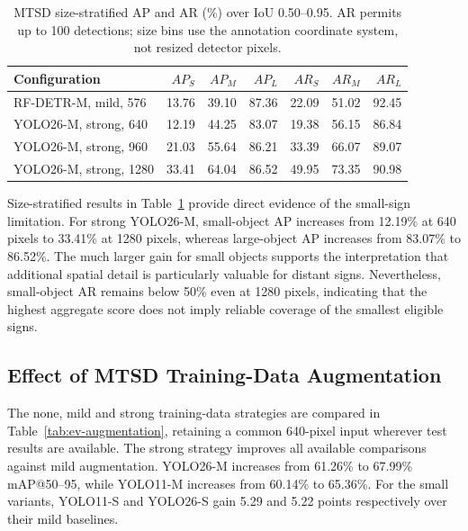 \begin{table}[htbp]
\centering
\small
\caption{\gls{MTSD} size-stratified \gls{AP} and AR (\%) over \gls{IoU} 0.50--0.95. AR permits up to 100 detections; size bins use the annotation coordinate system, not resized detector pixels.}
\label{tab:ev-size-ap}
\renewcommand{\arraystretch}{1.15}
\begin{tabularx}{\textwidth}{@{}>{\raggedright\arraybackslash}Xrrrrrr@{}}
\toprule
Configuration & $AP_S$ & $AP_M$ & $AP_L$ & $AR_S$ & $AR_M$ & $AR_L$ \\
\midrule
RF-DETR-M, mild, 576 & 13.76 & 39.10 & 87.36 & 22.09 & 51.02 & 92.45 \\
YOLO26-M, strong, 640 & 12.19 & 44.25 & 83.07 & 19.38 & 56.15 & 86.84 \\
YOLO26-M, strong, 960 & 21.03 & 55.64 & 86.21 & 33.39 & 66.07 & 89.07 \\
YOLO26-M, strong, 1280 & 33.41 & 64.04 & 86.52 & 49.95 & 73.35 & 90.98 \\
\bottomrule
\end{tabularx}
\end{table}


Size-stratified results in Table~\ref{tab:ev-size-ap} provide direct evidence of the small-sign limitation. For strong YOLO26-M, small-object \gls{AP} increases from 12.19\% at 640 pixels to 33.41\% at 1280 pixels, whereas large-object \gls{AP} increases from 83.07\% to 86.52\%. The much larger gain for small objects supports the interpretation that additional spatial detail is particularly valuable for distant signs. Nevertheless, small-object AR remains below 50\% even at 1280 pixels, indicating that the highest aggregate score does not imply reliable coverage of the smallest eligible signs.

\subsection{Effect of MTSD Training-Data Augmentation}
\label{sec:ev-augmentation}
The none, mild and strong training-data strategies are compared in Table~\ref{tab:ev-augmentation}, retaining a common 640-pixel input wherever test results are available. The strong strategy improves all available comparisons against mild augmentation. YOLO26-M increases from 61.26\% to 67.99\% \gls{mAP}@50--95, while YOLO11-M increases from 60.14\% to 65.36\%. For the small variants, YOLO11-S and YOLO26-S gain 5.29 and 5.22 points respectively over their mild baselines.

